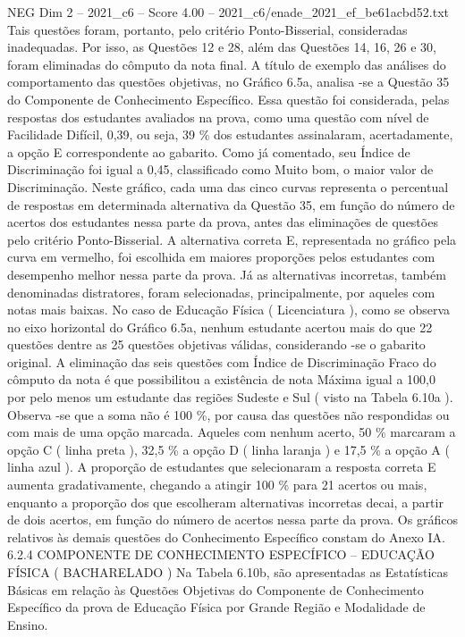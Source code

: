 \begin{textsample}{NEG Dim 2 – 2021\_c6 – Score 4.00 – 2021\_c6/enade\_2021\_ef\_be61acbd52.txt}
Tais questões foram, portanto, pelo critério Ponto-Bisserial, consideradas inadequadas.
Por isso, as Questões 12 e 28, além das Questões 14, 16, 26 e 30, foram eliminadas do cômputo da nota final.
A título de exemplo das análises do comportamento das questões objetivas, no Gráfico 6.5a, analisa -se a Questão 35 do Componente de Conhecimento Específico.
Essa questão foi considerada, pelas respostas dos estudantes avaliados na prova, como uma questão com nível de Facilidade Difícil, 0,39, ou seja, 39 \% dos estudantes assinalaram, acertadamente, a opção E correspondente ao gabarito.
Como já comentado, seu Índice de Discriminação foi igual a 0,45, classificado como Muito bom, o maior valor de Discriminação.
Neste gráfico, cada uma das cinco curvas representa o percentual de respostas em determinada alternativa da Questão 35, em função do número de acertos dos estudantes nessa parte da prova, antes das eliminações de questões pelo critério Ponto-Bisserial.
A alternativa correta E, representada no gráfico pela curva em vermelho, foi escolhida em maiores proporções pelos estudantes com desempenho melhor nessa parte da prova.
Já as alternativas incorretas, também denominadas distratores, foram selecionadas, principalmente, por aqueles com notas mais baixas.
No caso de Educação Física ( Licenciatura ), como se observa no eixo horizontal do Gráfico 6.5a, nenhum estudante acertou mais do que 22 questões dentre as 25 questões objetivas válidas, considerando -se o gabarito original.
A eliminação das seis questões com Índice de Discriminação Fraco do cômputo da nota é que possibilitou a existência de nota Máxima igual a 100,0 por pelo menos um estudante das regiões Sudeste e Sul ( visto na Tabela 6.10a ).
Observa -se que a soma não é 100 \%, por causa das questões não respondidas ou com mais de uma opção marcada.
Aqueles com nenhum acerto, 50 \% marcaram a opção C ( linha preta ), 32,5 \% a opção D ( linha laranja ) e 17,5 \% a opção A ( linha azul ).
A proporção de estudantes que selecionaram a resposta correta E aumenta gradativamente, chegando a atingir 100 \% para 21 acertos ou mais, enquanto a proporção dos que escolheram alternativas incorretas decai, a partir de dois acertos, em função do número de acertos nessa parte da prova.
Os gráficos relativos às demais questões do Conhecimento Específico constam do Anexo IA. 6.2.4 COMPONENTE DE CONHECIMENTO ESPECÍFICO – EDUCAÇÃO FÍSICA ( BACHARELADO ) Na Tabela 6.10b, são apresentadas as Estatísticas Básicas em relação às Questões Objetivas do Componente de Conhecimento Específico da prova de Educação Física por Grande Região e Modalidade de Ensino.

\end{textsample}
